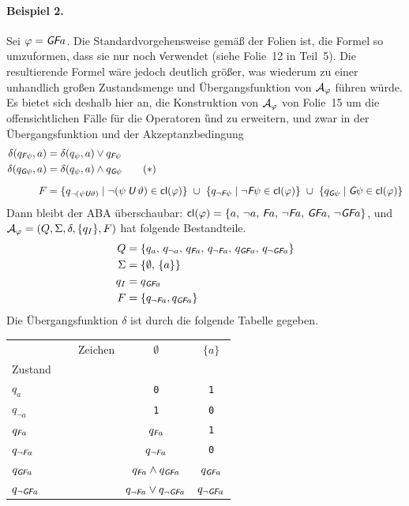 \documentclass[fontsize=11pt, twoside=false, numbers=autoenddot]{scrbook}
\begin{document}
\paragraph*{Beispiel 2.}
Sei $\varphi = \textit{\textsf{G}}\textit{\textsf{F}} a$.
Die Standardvorgehensweise gemäß der Folien ist,
die Formel so umzuformen, dass sie nur noch \U verwendet
(siehe Folie~12 in Teil~5).
Die resultierende Formel wäre jedoch deutlich größer,
was wiederum zu einer unhandlich großen Zustandsmenge und Übergangsfunktion von $\mathcal{A}_\varphi$ führen würde.
Es bietet sich deshalb hier an, die Konstruktion von $\mathcal{A}_\varphi$ von Folie~15
um die offensichtlichen Fälle für die Operatoren \G und \F zu erweitern,
und zwar in der Übergangsfunktion und der Akzeptanzbedingung
%
\begin{align*}
  \delta(q_{\textit{\textsf{F}}\psi},a) & = \delta(q_\psi,a) \lor q_{\textit{\textsf{F}}\psi}  \\
  \delta(q_{\textit{\textsf{G}}\psi},a) & = \delta(q_\psi,a) \land q_{\textit{\textsf{G}}\psi} \tag{$*$}\\[.4\baselineskip]
  F & = \{q_{\lnot(\psi\mathbin{\textit{\textsf{U}}} \vartheta)} \mid \lnot(\psi\mathbin{\textit{\textsf{U}}} \vartheta) \in \textsf{cl}(\varphi) \}
        ~\cup~ \{q_{\lnot\textit{\textsf{F}}\psi} \mid \lnot\textit{\textsf{F}}\psi \in \textsf{cl}(\varphi) \}
        ~\cup~ \{q_{\textit{\textsf{G}}\psi} \mid \textit{\textsf{G}}\psi \in \textsf{cl}(\varphi) \}
\end{align*}
%
Dann bleibt der ABA überschaubar: $\textsf{cl}(\varphi) = \{a,\,\lnot a,\,\textit{\textsf{F}} a,\,\lnot \textit{\textsf{F}} a,\,\textit{\textsf{G}}\textit{\textsf{F}} a,\,\lnot\textit{\textsf{G}}\textit{\textsf{F}} a\}$,
und $\mathcal{A}_\varphi = (Q,\Sigma,\delta,\{q_I\},F)$ hat folgende Bestandteile.
%
\begin{align*}
  Q      & = \{q_a,\,q_{\lnot a},\,q_{\textit{\textsf{F}} a},\,q_{\lnot\textit{\textsf{F}} a},\,q_{\textit{\textsf{G}}\textit{\textsf{F}} a},\,q_{\lnot\textit{\textsf{G}}\textit{\textsf{F}} a}\} \\
  \Sigma & = \{\emptyset,\,\{a\}\} \\
  q_I    & = q_{\textit{\textsf{G}}\textit{\textsf{F}} a} \\
  F      & = \{q_{\lnot\textit{\textsf{F}} a},q_{\textit{\textsf{G}}\textit{\textsf{F}} a}\}
\end{align*}
%
Die Übergangsfunktion $\delta$ ist durch die folgende Tabelle gegeben.
%
\begin{center}
  \begin{tabular}{l|cc}
    ~~~~~~~~~~~~Zeichen & $\emptyset$                             & $\{a\}$            \\
    Zustand             &                                         &                    \\
    \hline\rule{0pt}{11pt}%
    $q_a$               & \texttt{0}                              & \texttt{1}         \\[2pt]
    $q_{\lnot a}$       & \texttt{1}                              & \texttt{0}         \\[2pt]
    $q_{\textit{\textsf{F}} a}$          & $q_{\textit{\textsf{F}} a}$                              & \texttt{1}         \\[2pt]
    $q_{\lnot \textit{\textsf{F}} a}$    & $q_{\lnot\textit{\textsf{F}} a}$                         & \texttt{0}         \\[2pt]
    $q_{\textit{\textsf{G}}\textit{\textsf{F}} a}$        & $q_{\textit{\textsf{F}} a} \land q_{\textit{\textsf{G}}\textit{\textsf{F}} a}$             & $q_{\textit{\textsf{G}}\textit{\textsf{F}} a}$       \\[2pt]
    $q_{\lnot\textit{\textsf{G}}\textit{\textsf{F}} a}$   & $q_{\lnot \textit{\textsf{F}} a} \lor q_{\lnot \textit{\textsf{G}}\textit{\textsf{F}} a}$  & $q_{\lnot \textit{\textsf{G}}\textit{\textsf{F}} a}$
  \end{tabular}
\end{center}
\end{document}
